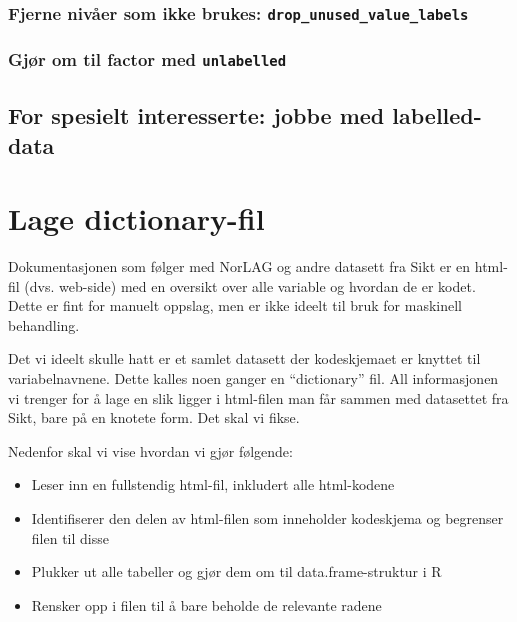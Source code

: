 \documentclass[
  letterpaper,
  DIV=11,
  numbers=noendperiod]{scrreprt}
\providecommand{\tightlist}{%
  \setlength{\itemsep}{0pt}\setlength{\parskip}{0pt}}\usepackage{longtable,booktabs,array}
\theoremstyle{definition}
\theoremstyle{remark}
\begin{document}
\hypertarget{fjerne-nivuxe5er-som-ikke-brukes-drop_unused_value_labels}{%
\subsection{\texorpdfstring{Fjerne nivåer som ikke brukes:
\texttt{drop\_unused\_value\_labels}}{Fjerne nivåer som ikke brukes: drop\_unused\_value\_labels}}\label{fjerne-nivuxe5er-som-ikke-brukes-drop_unused_value_labels}}

\hypertarget{gjuxf8r-om-til-factor-med-unlabelled}{%
\subsection{\texorpdfstring{Gjør om til factor med
\texttt{unlabelled}}{Gjør om til factor med unlabelled}}\label{gjuxf8r-om-til-factor-med-unlabelled}}

\hypertarget{for-spesielt-interesserte-jobbe-med-labelled-data}{%
\section{For spesielt interesserte: jobbe med
labelled-data}\label{for-spesielt-interesserte-jobbe-med-labelled-data}}

\hypertarget{lage-dictionary-fil}{%
\chapter{Lage dictionary-fil}\label{lage-dictionary-fil}}

Dokumentasjonen som følger med NorLAG og andre datasett fra Sikt er en
html-fil (dvs. web-side) med en oversikt over alle variable og hvordan
de er kodet. Dette er fint for manuelt oppslag, men er ikke ideelt til
bruk for maskinell behandling.

Det vi ideelt skulle hatt er et samlet datasett der kodeskjemaet er
knyttet til variabelnavnene. Dette kalles noen ganger en ``dictionary''
fil. All informasjonen vi trenger for å lage en slik ligger i html-filen
man får sammen med datasettet fra Sikt, bare på en knotete form. Det
skal vi fikse.

Nedenfor skal vi vise hvordan vi gjør følgende:

\begin{itemize}
\tightlist
\item
  Leser inn en fullstendig html-fil, inkludert alle html-kodene
\item
  Identifiserer den delen av html-filen som inneholder kodeskjema og
  begrenser filen til disse
\item
  Plukker ut alle tabeller og gjør dem om til data.frame-struktur i R
\item
  Rensker opp i filen til å bare beholde de relevante radene
\end{itemize}
\end{document}
